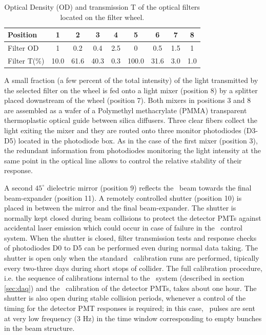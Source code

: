 \begin{table}[!htpb]
 \begin{center}
\caption{Optical Density (OD) and transmission T of the optical filters located on the filter wheel.}\label{tab:filterwheelfilt}
\begin{tabular}{lcccccccc}
\hline
Position & 1 & 2 & 3 & 4 & 5 & 6 & 7 & 8\\
\hline
Filter OD & 1 & 0.2 & 0.4 & 2.5 & 0 & 0.5 & 1.5 & 1 \\
\hline
Filter T(\%) & 10.0 & 61.6 & 40.3 & 0.3 & 100.0 & 31.6 & 3.0 & 1.0 \\
\hline 
\end{tabular}
\end{center}
\end{table}


 A small fraction (a few percent of the total intensity) of the light transmitted by
the selected filter on the wheel is fed onto a light mixer (position 8) by a
splitter placed downstream of the wheel (position 7). Both mixers in positions 3 and 8
are assembled as a wafer of a Polymethyl methacrylate (PMMA) transparent thermoplastic optical guide between silica diffusers.
Three clear fibers collect the light exiting the mixer and they are routed onto
three monitor photodiodes (D3-D5) located in the photodiode box. As in the case of the
first mixer (position 3), the redundant information from photodiodes monitoring the
light intensity at the same point in the optical line allows to control the relative
stability of their response. 

A second $45^{\circ}$ dielectric mirror (position 9) reflects the \laser~beam towards
the final beam-expander (position 11). A remotely controlled shutter (position 10) is
placed in between the mirror and the final beam-expander. The shutter is normally
kept closed during beam collisions to protect the detector PMTs against accidental
laser emission which could occur in case of failure in the \laser~control system. When the
shutter is closed, filter transmission tests and response checks of photodiodes
D0 to D5 can be performed even during normal data taking. The shutter is open only
when the standard \laser~calibration runs are performed, tipically every two-three
days during short stops of collider. The full calibration procedure, i.e. the sequence
of calibrations internal to the \laser~system (described in section \ref{sec:daq}) and the
\laser~calibration of the detector PMTs, takes about one hour. The shutter is also
open during stable collision periods, whenever a control of the timing for the
detector PMT responses is required; in this case, \laser~pulses are sent at very low
frequency (3 Hz) in the time window corresponding to empty bunches in the beam structure. 


